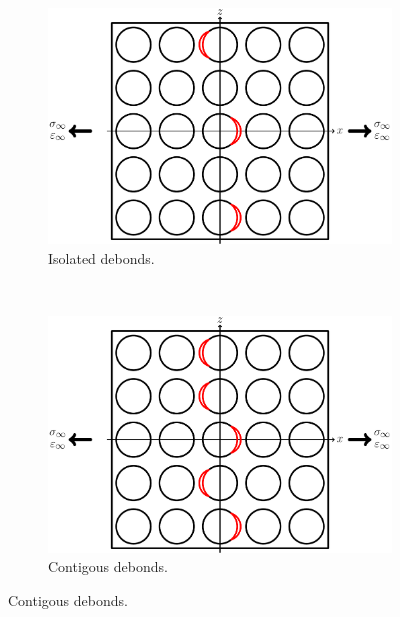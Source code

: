 \begin{figure}[!h]
\centering
    \begin{subfigure}[b]{0.45\textwidth}
        \includegraphics[width=\textwidth]{pics/stage1-isolateddebonds.pdf}
       \caption{Isolated debonds.}\label{intro:fig:schematic-transversecracks-a}
    \end{subfigure}
    ~
    \begin{subfigure}[b]{0.45\textwidth}
        \includegraphics[width=\textwidth]{pics/stage2-critdebonds.pdf}
       \caption{Contigous debonds.}\label{intro:fig:schematic-transversecracks-b}
    \end{subfigure}


\end{figure}
